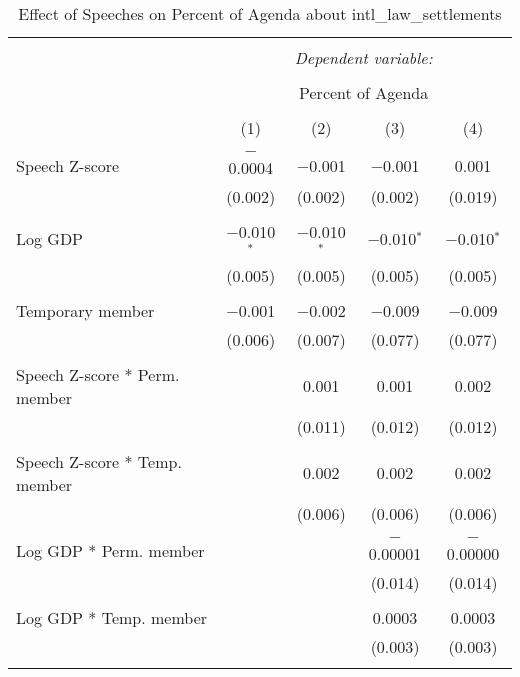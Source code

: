 
\begin{table}[!htbp] \centering 
  \caption{Effect of Speeches on Percent of Agenda about intl_law_settlements} 
  \label{} 
\begin{tabular}{@{\extracolsep{5pt}}lcccc} 
\\[-1.8ex]\hline 
\hline \\[-1.8ex] 
 & \multicolumn{4}{c}{\textit{Dependent variable:}} \\ 
\cline{2-5} 
\\[-1.8ex] & \multicolumn{4}{c}{Percent of Agenda} \\ 
\\[-1.8ex] & (1) & (2) & (3) & (4)\\ 
\hline \\[-1.8ex] 
 Speech Z-score & $-$0.0004 & $-$0.001 & $-$0.001 & 0.001 \\ 
  & (0.002) & (0.002) & (0.002) & (0.019) \\ 
  & & & & \\ 
 Log GDP & $-$0.010$^{*}$ & $-$0.010$^{*}$ & $-$0.010$^{*}$ & $-$0.010$^{*}$ \\ 
  & (0.005) & (0.005) & (0.005) & (0.005) \\ 
  & & & & \\ 
 Temporary member & $-$0.001 & $-$0.002 & $-$0.009 & $-$0.009 \\ 
  & (0.006) & (0.007) & (0.077) & (0.077) \\ 
  & & & & \\ 
 Speech Z-score * Perm. member &  & 0.001 & 0.001 & 0.002 \\ 
  &  & (0.011) & (0.012) & (0.012) \\ 
  & & & & \\ 
 Speech Z-score * Temp. member &  & 0.002 & 0.002 & 0.002 \\ 
  &  & (0.006) & (0.006) & (0.006) \\ 
  & & & & \\ 
 Log GDP * Perm. member &  &  & $-$0.00001 & $-$0.00000 \\ 
  &  &  & (0.014) & (0.014) \\ 
  & & & & \\ 
 Log GDP * Temp. member &  &  & 0.0003 & 0.0003 \\ 
  &  &  & (0.003) & (0.003) \\ 
  & & & & \\ 

\end{tabular}
\end{table}
